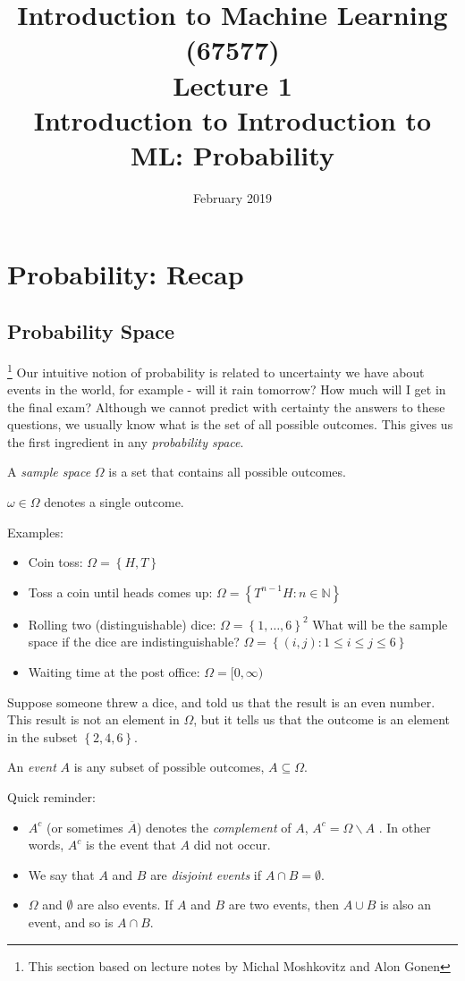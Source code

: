 \documentclass[11pt]{article}
\title{{\large{Introduction to Machine Learning (67577)}}\\
\vphantom{}Lecture 1 \\
Introduction to Introduction to ML: Probability}
\date{February 2019}
\begin{document}
\maketitle

\tableofcontents
\pagebreak

\section{Probability: Recap}
\subsection{Probability Space}
\footnote{This section based on lecture notes by Michal Moshkovitz and Alon Gonen} Our intuitive notion of probability is related to uncertainty we have about events in the world, for example - will it rain tomorrow? How much will I get in the final exam? Although we cannot predict with certainty the answers to these questions, we usually know what is the set of all possible outcomes. This gives us the first ingredient in any \emph{probability space}.
\begin{definition}
A \textit{sample space} $\Omega$ is a set that contains all possible outcomes.

$\omega\in\Omega$ denotes a single outcome.
\end{definition}
Examples:
\begin{itemize}
\item Coin toss: $\Omega=\left\{ H,T\right\} $
\item Toss a coin until heads comes up: $\Omega=\left\{ T^{n-1}H:n\in\mathbb{N}\right\} $
\item Rolling two (distinguishable) dice: $\Omega=\left\{ 1,\dots,6\right\} ^{2}$
What will be the sample space if the dice are indistinguishable? $\Omega=\left\{ \left(i,j\right):1\le i\le j\le6\right\} $
\item Waiting time at the post office: $\Omega=[0,\infty)$
\end{itemize}
Suppose someone threw a dice, and told us that the result is an even number. This result is not an element in $\Omega$, but it tells us that the outcome is an element in the subset $\left\{ 2,4,6\right\} $.
\begin{definition}
An \textit{event} $A$ is any subset of possible outcomes, $A\subseteq\Omega$.
\end{definition}
Quick reminder:
\begin{itemize}
\item $A^{c}$ (or sometimes $\overline{A}$) denotes the \textit{complement} of $A$, $A^{c}=\Omega\backslash A$ . In other words, $A^{c}$ is the event that $A$ did not occur. 
\item We say that $A$ and $B$ are \textit{disjoint} \textit{events} if $A\cap B=\emptyset$.
\item $\Omega$ and $\emptyset$ are also events. If $A$ and $B$ are two events, then $A\cup B$ is also an event, and so is $A\cap B$. 
\end{itemize}
\end{document}
